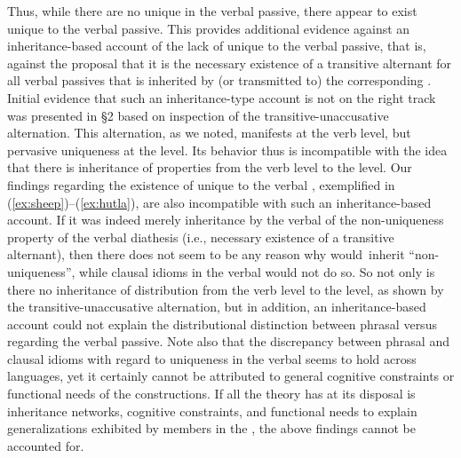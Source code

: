 \documentclass[output=paper,
modfonts
]{LSP/langsci}
\begin{document}
Thus, while there are no unique  in the verbal passive,
there appear to exist  unique to the verbal passive. This
provides additional evidence against an inheritance-based account of the
lack of  unique to the verbal passive, that is, against
the proposal that it is the necessary existence of a transitive alternant for all verbal {passives} that is inherited by (or transmitted to) the corresponding  . Initial evidence that such an
inheritance-type account is not on the right track was presented in
\S2 based on inspection of the transitive-unaccusative
alternation. This alternation, as we noted, manifests  at the
verb level, but pervasive uniqueness at the  level. Its behavior
thus is incompatible with the idea that there is inheritance of
properties from the verb level to the  level. Our  findings
regarding the existence of  unique to the verbal , exemplified in (\ref{ex:sheep})--(\ref{ex:hutla}),
are also incompatible with such an inheritance-based account. If it was
indeed merely inheritance by the verbal   of the
non-uniqueness property of the verbal  diathesis (i.e., necessary
existence of a transitive alternant), then there does not seem to be any
reason why  would~inherit ``non-uniqueness'', while clausal
idioms in the verbal  would not do so. So not only is there no
inheritance of distribution from the verb level to the  level, as
shown by the transitive-unaccusative alternation, but in addition, an
inheritance-based account could not explain the distributional
distinction between phrasal versus  regarding the verbal
passive. Note also that the discrepancy between phrasal and clausal
idioms with regard to uniqueness in the verbal  seems to hold
across languages, yet it certainly cannot be attributed to general
cognitive constraints or functional needs of the constructions. If all
the theory has at its disposal is inheritance networks, cognitive
constraints, and functional needs to explain generalizations exhibited
by members in the , the above findings cannot be
accounted for.
\end{document}
